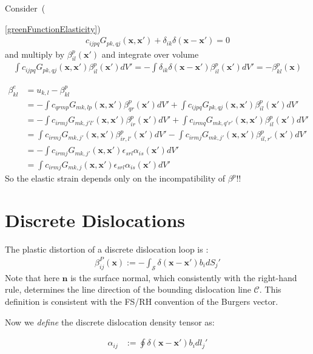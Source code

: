 \documentclass[10pt]{report}
\begin{document}
Consider~({\ref{greenFunctionElasticity}) 
\begin{align}
c_{ijpq}G_{pk,qj}(\bm x,\bm x')+\delta_{ik}\delta(\bm x-\bm x')=0
\end{align}
and multiply by $\beta^p_{il}(\bm x')$ and integrate over volume
\begin{align}
\int c_{ijpq}G_{pk,qj}(\bm x,\bm x')\beta^p_{il}(\bm x')dV'=-\int \delta_{ik}\delta(\bm x-\bm x')\beta^p_{il}(\bm x')dV'=-\beta^p_{kl}(\bm x)
\end{align}


\begin{align}
\beta^e_{kl}&=u_{k,l}-\beta^p_{kl}\nonumber\\
&=-\int c_{qrmp}G_{mk,lp}(\bm x,\bm x')\beta^p_{qr}(\bm x')dV'+\int c_{ijpq}G_{pk,qj}(\bm x,\bm x')\beta^p_{il}(\bm x')dV'\nonumber\\
&=-\int c_{irmj}G_{mk,j'l'}(\bm x,\bm x')\beta^p_{ir}(\bm x')dV'+\int c_{irmq}G_{mk,q'r'}(\bm x,\bm x')\beta^p_{il}(\bm x')dV'\nonumber\\
&=\int c_{irmj}G_{mk,j'}(\bm x,\bm x')\beta^p_{ir,l'}(\bm x')dV'-\int c_{irmj}G_{mk,j'}(\bm x,\bm x')\beta^p_{il,r'}(\bm x')dV'\nonumber\\
&=-\int c_{irmj}G_{mk,j'}(\bm x,\bm x')\epsilon_{srl}\alpha_{is}(\bm x')dV'\nonumber\\
&=\int c_{irmj}G_{mk,j}(\bm x,\bm x')\epsilon_{srl}\alpha_{is}(\bm x')dV'
\end{align}
So the elastic strain depends only on the incompatibility of $\beta^p$!!

\section{Discrete Dislocations}

The plastic distortion of a discrete dislocation loop is \citet[p. 46/47]{Mura:1987wt} :
\begin{align}
\beta^P_{ij}(\bm x):=-\int_\mathcal{S} \delta(\bm x-\bm x')b_idS_j'
\end{align}
Note that here $\hat{\bm n}$ is the surface normal, which consistently with the right-hand rule, determines the line direction of the bounding dislocation line $\mathcal{C}$. This definition is consistent with the FS/RH convention of the Burgers vector. 

Now we \textit{define} the discrete dislocation density tensor as:


\begin{align}
\alpha_{ij}&:=\oint\delta(\bm x-\bm x')b_idl_j'
\end{align}

}
\end{document}
